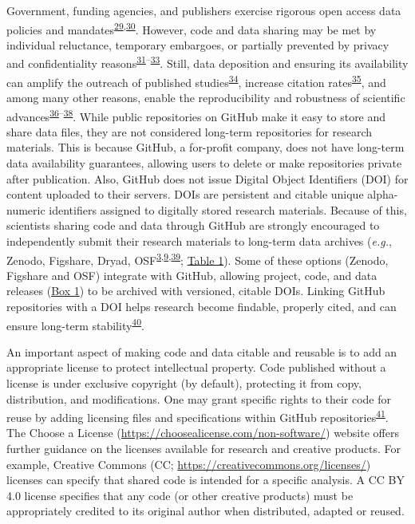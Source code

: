 Government, funding agencies, and publishers exercise rigorous open access data policies and mandates\textsuperscript{\protect\hyperlink{ref-PLmDFZrm}{29},\protect\hyperlink{ref-1Hcf13Q0k}{30}}.
However, code and data sharing may be met by individual reluctance, temporary embargoes, or partially prevented by privacy and confidentiality reasons\textsuperscript{\protect\hyperlink{ref-1Ch6LSHef}{31}--\protect\hyperlink{ref-1CzUZwyU2}{33}}.
Still, data deposition and ensuring its availability can amplify the outreach of published studies\textsuperscript{\protect\hyperlink{ref-666HppfO}{34}}, increase citation rates\textsuperscript{\protect\hyperlink{ref-1CcAUn3Lu}{35}}, and among many other reasons, enable the reproducibility and robustness of scientific advances\textsuperscript{\protect\hyperlink{ref-4LaijDIZ}{36}--\protect\hyperlink{ref-1HZdsK5Kn}{38}}.
While public repositories on GitHub make it easy to store and share data files, they are not considered long-term repositories for research materials.
This is because GitHub, a for-profit company, does not have long-term data availability guarantees, allowing users to delete or make repositories private after publication.
Also, GitHub does not issue Digital Object Identifiers (DOI) for content uploaded to their servers.
DOIs are persistent and citable unique alpha-numeric identifiers assigned to digitally stored research materials.
Because of this, scientists sharing code and data through GitHub are strongly encouraged to independently submit their research materials to long-term data archives (\emph{e.g.}, Zenodo, Figshare, Dryad, OSF\textsuperscript{\protect\hyperlink{ref-10ghgV3S8}{3},\protect\hyperlink{ref-kEX5dgzK}{9},\protect\hyperlink{ref-1Du6fzB8g}{39}}; \protect\hyperlink{tbl:compare}{Table 1}).
Some of these options (Zenodo, Figshare and OSF) integrate with GitHub, allowing project, code, and data releases (\protect\hyperlink{definitions}{Box 1}) to be archived with versioned, citable DOIs.
Linking GitHub repositories with a DOI helps research become findable, properly cited, and can ensure long-term stability\textsuperscript{\protect\hyperlink{ref-iIEKCTLU}{40}}.

An important aspect of making code and data citable and reusable is to add an appropriate license to protect intellectual property.
Code published without a license is under exclusive copyright (by default), protecting it from copy, distribution, and modifications.
One may grant specific rights to their code for reuse by adding licensing files and specifications within GitHub repositories\textsuperscript{\protect\hyperlink{ref-TOsASkn5}{41}}.
The Choose a License (\url{https://choosealicense.com/non-software/}) website offers further guidance on the licenses available for research and creative products.
For example, Creative Commons (CC; \url{https://creativecommons.org/licenses/}) licenses can specify that shared code is intended for a specific analysis.
A CC BY 4.0 license specifies that any code (or other creative products) must be appropriately credited to its original author when distributed, adapted or reused.

